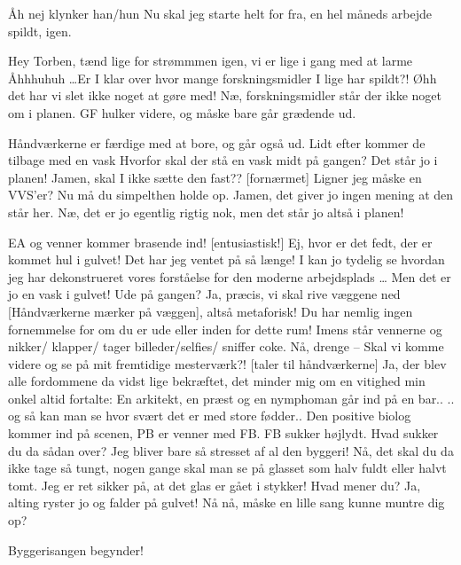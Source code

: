 \documentclass[a4paper,11pt]{article}
\begin{document}
\begin{sketch}
 Åh nej klynker han/hun Nu skal jeg starte helt for fra, en hel måneds arbejde spildt, igen.

  Hey Torben, tænd lige for strømmmen igen, vi er lige i gang med at larme
\scene [lys op]
 Åhhhuhuh \ldots Er I klar over hvor mange forskningsmidler I lige har spildt?!
 Øhh det har vi slet ikke noget at gøre med!
  Næ, forskningsmidler står der ikke noget om i planen.
\scene GF hulker videre, og måske bare går grædende ud.

\scene Håndværkerne er færdige med at bore, og går også ud. Lidt efter kommer de tilbage med en vask
 Hvorfor skal der stå en vask midt på gangen?
 Det står jo i planen!
 Jamen, skal I ikke sætte den fast??
[fornærmet] Ligner jeg måske en VVS'er? Nu må du simpelthen holde op. 
 Jamen, det giver jo ingen mening at den står her.
  Næ, det er jo egentlig rigtig nok,  men det står jo altså i planen!

\scene EA og venner kommer brasende ind!
[entusiastisk!] Ej, hvor er det fedt, der er kommet hul i gulvet! Det har jeg ventet på så længe! I kan jo tydelig se hvordan jeg har dekonstrueret vores forståelse for den moderne arbejdsplads \ldots
{} Men det er jo en vask i gulvet! Ude på gangen?
 Ja, præcis, vi skal rive væggene ned [Håndværkerne mærker på væggen], altså metaforisk! Du har nemlig ingen fornemmelse for om du er ude eller inden for dette rum!
\scene Imens står vennerne og nikker/ klapper/ tager billeder/selfies/ sniffer coke.
  Nå, drenge -- Skal vi komme videre og se på mit fremtidige mesterværk?! 
[taler til håndværkerne] Ja, der blev alle fordommene da vidst lige bekræftet, det minder mig om en vitighed min onkel altid fortalte: En arkitekt, en præst og en nymphoman går ind på en bar.. .. og så kan man se hvor svært det er med store fødder..
\scene Den positive biolog kommer ind på scenen, PB er venner med FB. FB sukker højlydt.
 Hvad sukker du da sådan over?
 Jeg bliver bare så stresset af al den byggeri!
 Nå, det skal du da ikke tage så tungt, nogen gange skal man se på glasset som halv fuldt eller halvt tomt.
 Jeg er ret sikker på, at det glas er gået i stykker!
 Hvad mener du?
  Ja, alting ryster jo og falder på gulvet!
 Nå nå, måske en lille sang kunne muntre dig op?

Byggerisangen begynder!

\end{sketch}
\end{document}
